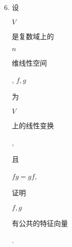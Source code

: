 \documentclass[10pt]{article}
\begin{document}
\begin{enumerate}
  \setcounter{enumi}{5}
  \item \begin{CJK}{UTF8}{mj}设\end{CJK} $V$ \begin{CJK}{UTF8}{mj}是复数域上的\end{CJK} $n$ \begin{CJK}{UTF8}{mj}维线性空间\end{CJK}, $f, g$ \begin{CJK}{UTF8}{mj}为\end{CJK} $V$ \begin{CJK}{UTF8}{mj}上的线性变换\end{CJK}, \begin{CJK}{UTF8}{mj}且\end{CJK} $f g=g f$, \begin{CJK}{UTF8}{mj}证明\end{CJK} $f, g$ \begin{CJK}{UTF8}{mj}有公共的特征向量\end{CJK}.


\end{enumerate}
\end{document}

